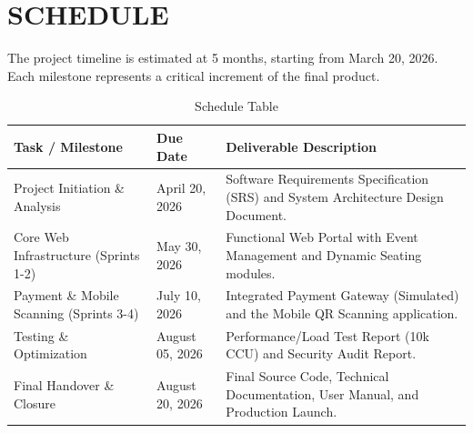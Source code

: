 \chapter{SCHEDULE}

The project timeline is estimated at 5 months, starting from March 20, 2026. Each milestone represents a critical increment of the final product.

\begin{table}[h!]
\centering
\renewcommand{\arraystretch}{1.5}
\begin{tabular}{|p{}|p{}|p{}|}
\hline
\rowcolor[HTML]{EFEFEF} 
\textbf{Task / Milestone} & \textbf{Due Date} & \textbf{Deliverable Description} \\ \hline
Project Initiation \& Analysis & April 20, 2026 & Software Requirements Specification (SRS) and System Architecture Design Document. \\ \hline
Core Web Infrastructure (Sprints 1-2) & May 30, 2026 & Functional Web Portal with Event Management and Dynamic Seating modules. \\ \hline
Payment \& Mobile Scanning (Sprints 3-4) & July 10, 2026 & Integrated Payment Gateway (Simulated) and the Mobile QR Scanning application. \\ \hline
Testing \& Optimization & August 05, 2026 & Performance/Load Test Report (10k CCU) and Security Audit Report. \\ \hline
Final Handover \& Closure & August 20, 2026 & Final Source Code, Technical Documentation, User Manual, and Production Launch. \\ \hline
\end{tabular}
\caption{Schedule Table}
\end{table}